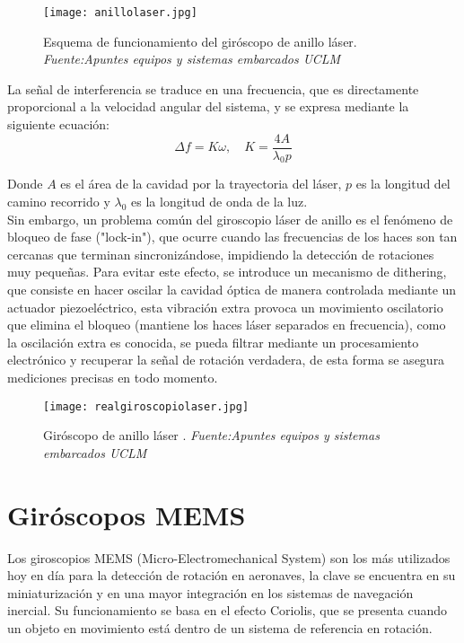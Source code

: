 \begin{figure}[H]
    \centering
    \texttt{[image: anillolaser.jpg]}
    \caption{\centering Esquema de funcionamiento del giróscopo de anillo láser.\textit{ Fuente:Apuntes equipos y sistemas embarcados UCLM}}
    \label{fig:cabese}
\end{figure}


La señal de interferencia se traduce en una frecuencia, que es directamente proporcional a la velocidad angular del sistema, y se expresa mediante la siguiente ecuación: 
\begin{equation}
\Delta f = K \omega, \quad K = \frac{4A}{\lambda_0 p}
\end{equation}

Donde \(A\) es el área de la cavidad por la trayectoria del láser, \(p\) es la longitud del camino recorrido y \(\lambda_0\) es la longitud de onda de la luz.\\

Sin embargo, un problema común del giroscopio láser de anillo es el fenómeno de bloqueo de fase ("lock-in"), que ocurre cuando las frecuencias de los haces son tan cercanas que terminan sincronizándose, impidiendo la detección de rotaciones muy pequeñas. Para evitar este efecto, se introduce un mecanismo de dithering, que consiste en hacer oscilar la cavidad óptica de manera controlada mediante un actuador piezoeléctrico, esta vibración extra provoca un movimiento oscilatorio que elimina el bloqueo (mantiene los haces láser separados en frecuencia), como la oscilación extra es conocida, se pueda filtrar mediante un procesamiento electrónico y recuperar la señal de rotación verdadera, de esta forma se asegura mediciones precisas en todo momento.\\

\begin{figure}[H]
    \centering
    \texttt{[image: realgiroscopiolaser.jpg]}
    \caption{\centering Giróscopo de anillo láser .\textit{ Fuente:Apuntes equipos y sistemas embarcados UCLM}}
    \label{fig:cabe}
\end{figure}

\section{Giróscopos MEMS}

Los giroscopios MEMS (Micro-Electromechanical System) son los más utilizados hoy en día para la detección de rotación en aeronaves, la clave se encuentra en su miniaturización y en una mayor integración en los sistemas de navegación inercial. Su funcionamiento se basa en el efecto Coriolis, que se presenta cuando un objeto en movimiento está dentro de un sistema de referencia en rotación.
 
